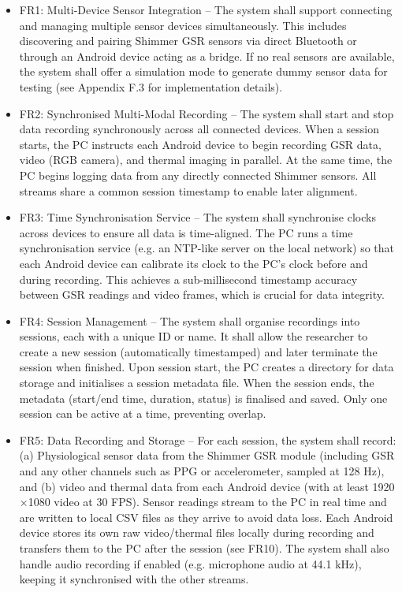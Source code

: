 \begin{itemize}
    \item FR1: Multi-Device Sensor Integration -- The system shall support connecting and managing multiple sensor devices simultaneously. This includes discovering and pairing Shimmer GSR sensors via direct Bluetooth or through an Android device acting as a bridge. If no real sensors are available, the system shall offer a simulation mode to generate dummy sensor data for testing (see Appendix F.3 for implementation details).

    \item FR2: Synchronised Multi-Modal Recording -- The system shall start and stop data recording synchronously across all connected devices. When a session starts, the PC instructs each Android device to begin recording GSR data, video (RGB camera), and thermal imaging in parallel. At the same time, the PC begins logging data from any directly connected Shimmer sensors. All streams share a common session timestamp to enable later alignment.

    \item FR3: Time Synchronisation Service -- The system shall synchronise clocks across devices to ensure all data is time-aligned. The PC runs a time synchronisation service (e.g. an NTP-like server on the local network) so that each Android device can calibrate its clock to the PC's clock before and during recording. This achieves a sub-millisecond timestamp accuracy between GSR readings and video frames, which is crucial for data integrity.

    \item FR4: Session Management -- The system shall organise recordings into sessions, each with a unique ID or name. It shall allow the researcher to create a new session (automatically timestamped) and later terminate the session when finished. Upon session start, the PC creates a directory for data storage and initialises a session metadata file. When the session ends, the metadata (start/end time, duration, status) is finalised and saved. Only one session can be active at a time, preventing overlap.

    \item FR5: Data Recording and Storage -- For each session, the system shall record: (a) Physiological sensor data from the Shimmer GSR module (including GSR and any other channels such as PPG or accelerometer, sampled at 128 Hz), and (b) video and thermal data from each Android device (with at least 1920$\times$1080 video at 30 FPS). Sensor readings stream to the PC in real time and are written to local CSV files as they arrive to avoid data loss. Each Android device stores its own raw video/thermal files locally during recording and transfers them to the PC after the session (see FR10). The system shall also handle audio recording if enabled (e.g. microphone audio at 44.1 kHz), keeping it synchronised with the other streams.


\end{itemize}
